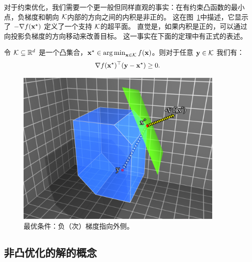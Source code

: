 对于约束优化，我们需要一个更一般但同样直观的事实：在有约束凸函数的最小点，负梯度和朝向 $\mathcal K$内部的方向之间的内积是非正的。
这在图~\ref{fig:optimality}中描述，它显示了 $-\nabla f(\mathbf x^\star)$ 定义了一个支持 $\mathcal K$的超平面。
直觉是，如果内积是正的，可以通过向投影负梯度的方向移动来改善目标。
这一事实在下面的定理中有正式的表述。
\begin{theorem}  \label{thm:optim-conditions}
令 $\mathcal K \subseteq {\mathbb R}^d$ 是一个凸集合，$\mathbf x^\star \in \operatorname*{\arg\min}_{\mathbf x \in  \mathcal K} f(\mathbf x)$。则对于任意 $\mathbf y \in \mathcal K$ 我们有：
$$ \nabla f(\mathbf x^\star) ^\top ( \mathbf y - \mathbf x^\star ) \geq 0.  $$
\end{theorem}
\begin{figure}[h!]
\begin{center}
\includegraphics[width=4in]{figs/fig_kt}
\end{center}
\caption{
    最优条件：负（次）梯度指向外侧。
    \label{fig:optimality}}
\end{figure}


\subsection{
    非凸优化的解的概念
    }

